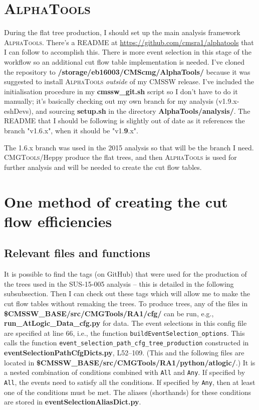\section{\textsc{AlphaTools}}

During the flat tree production, I should set up the main analysis framework \textsc{AlphaTools}. There's a README at \url{https://github.com/cmsra1/alphatools} that I can follow to accomplish this. There is more event selection in this stage of the workflow so an additional cut flow table implementation is needed. I've cloned the repository to \textbf{/storage/eb16003/CMScmg/AlphaTools/} because it was suggested to install \textsc{AlphaTools} \emph{outside} of my CMSSW release. I've included the initialisation procedure in my \textbf{cmssw\_git.sh} script so I don't have to do it manually; it's basically checking out my own branch for my analysis (v1.9.x-eshDevs), and sourcing \textbf{setup.sh} in the directory \textbf{AlphaTools/analysis/}. The README that I should be following is slightly out of date as it references the branch "v1.6.x", when it should be "v1.\textbf{9}.x". 

The 1.6.x branch was used in the 2015 analysis so that will be the branch I need. \textsc{CMGTools}/Heppy produce the flat trees, and then \textsc{AlphaTools} is used for further analysis and will be needed to create the cut flow tables.

\section{One method of creating the cut flow efficiencies}

\subsection{Relevant files and functions}

It is possible to find the tags (on GitHub) that were used for the production of the trees used in the SUS-15-005 analysis -- this is detailed in the following subsubsection. Then I can check out these tags which will allow me to make the cut flow tables without remaking the trees. To produce trees, any of the files in \textbf{\$CMSSW\_BASE/src/CMGTools/RA1/cfg/} can be run, e.g., \textbf{run\_AtLogic\_Data\_cfg.py} for data. The event selections in this config file are specified at line 66, i.e., the function \texttt{buildEventSelection\_options}. This calls the function \texttt{event\_selection\_path\_cfg\_tree\_production} constructed in \textbf{eventSelectionPathCfgDicts.py}, L52--109. (This and the following files are located in \textbf{\$CMSSW\_BASE/src/CMGTools/RA1/python/atlogic/}.) It is a nested combination of conditions combined with \texttt{All} and \texttt{Any}. If specified by \texttt{All}, the events need to satisfy all the conditions. If specified by \texttt{Any}, then at least one of the conditions must be met. The aliases (shorthands) for these conditions are stored in \textbf{eventSelectionAliasDict.py}.

